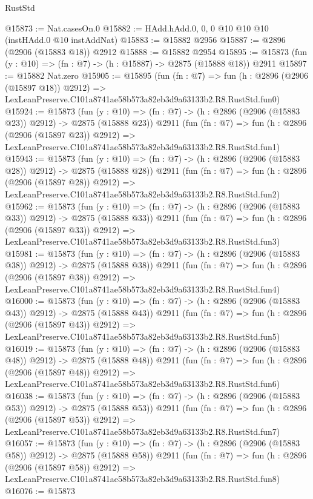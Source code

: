 \begin{lexlean}{RustStd}
\begin{coremodule}
@15873 := Nat.casesOn.{0}
@15882 := HAdd.hAdd.{0, 0, 0} @10 @10 @10 (instHAdd.{0} @10 instAddNat)
@15883 := @15882 @2956
@15887 := @2896 (@2906 (@15883 @18)) @2912
@15888 := @15882 @2954
@15895 := @15873 (fun (y : @10) => (fn : @7) -> (h : @15887) -> @2875 (@15888 @18)) @2911
@15897 := @15882 Nat.zero
@15905 := @15895
    (fun (fn : @7) =>
    fun (h : @2896 (@2906 (@15897 @18)) @2912) =>
    LexLeanPreserve.C101a8741ae58b573a82eb3d9a63133b2.R8.RustStd.fun0)
@15924 := @15873
    (fun (y : @10) => (fn : @7) -> (h : @2896 (@2906 (@15883 @23)) @2912) -> @2875 (@15888 @23))
    @2911
    (fun (fn : @7) =>
    fun (h : @2896 (@2906 (@15897 @23)) @2912) =>
    LexLeanPreserve.C101a8741ae58b573a82eb3d9a63133b2.R8.RustStd.fun1)
@15943 := @15873
    (fun (y : @10) => (fn : @7) -> (h : @2896 (@2906 (@15883 @28)) @2912) -> @2875 (@15888 @28))
    @2911
    (fun (fn : @7) =>
    fun (h : @2896 (@2906 (@15897 @28)) @2912) =>
    LexLeanPreserve.C101a8741ae58b573a82eb3d9a63133b2.R8.RustStd.fun2)
@15962 := @15873
    (fun (y : @10) => (fn : @7) -> (h : @2896 (@2906 (@15883 @33)) @2912) -> @2875 (@15888 @33))
    @2911
    (fun (fn : @7) =>
    fun (h : @2896 (@2906 (@15897 @33)) @2912) =>
    LexLeanPreserve.C101a8741ae58b573a82eb3d9a63133b2.R8.RustStd.fun3)
@15981 := @15873
    (fun (y : @10) => (fn : @7) -> (h : @2896 (@2906 (@15883 @38)) @2912) -> @2875 (@15888 @38))
    @2911
    (fun (fn : @7) =>
    fun (h : @2896 (@2906 (@15897 @38)) @2912) =>
    LexLeanPreserve.C101a8741ae58b573a82eb3d9a63133b2.R8.RustStd.fun4)
@16000 := @15873
    (fun (y : @10) => (fn : @7) -> (h : @2896 (@2906 (@15883 @43)) @2912) -> @2875 (@15888 @43))
    @2911
    (fun (fn : @7) =>
    fun (h : @2896 (@2906 (@15897 @43)) @2912) =>
    LexLeanPreserve.C101a8741ae58b573a82eb3d9a63133b2.R8.RustStd.fun5)
@16019 := @15873
    (fun (y : @10) => (fn : @7) -> (h : @2896 (@2906 (@15883 @48)) @2912) -> @2875 (@15888 @48))
    @2911
    (fun (fn : @7) =>
    fun (h : @2896 (@2906 (@15897 @48)) @2912) =>
    LexLeanPreserve.C101a8741ae58b573a82eb3d9a63133b2.R8.RustStd.fun6)
@16038 := @15873
    (fun (y : @10) => (fn : @7) -> (h : @2896 (@2906 (@15883 @53)) @2912) -> @2875 (@15888 @53))
    @2911
    (fun (fn : @7) =>
    fun (h : @2896 (@2906 (@15897 @53)) @2912) =>
    LexLeanPreserve.C101a8741ae58b573a82eb3d9a63133b2.R8.RustStd.fun7)
@16057 := @15873
    (fun (y : @10) => (fn : @7) -> (h : @2896 (@2906 (@15883 @58)) @2912) -> @2875 (@15888 @58))
    @2911
    (fun (fn : @7) =>
    fun (h : @2896 (@2906 (@15897 @58)) @2912) =>
    LexLeanPreserve.C101a8741ae58b573a82eb3d9a63133b2.R8.RustStd.fun8)
@16076 := @15873

\end{coremodule}
\end{lexlean}
